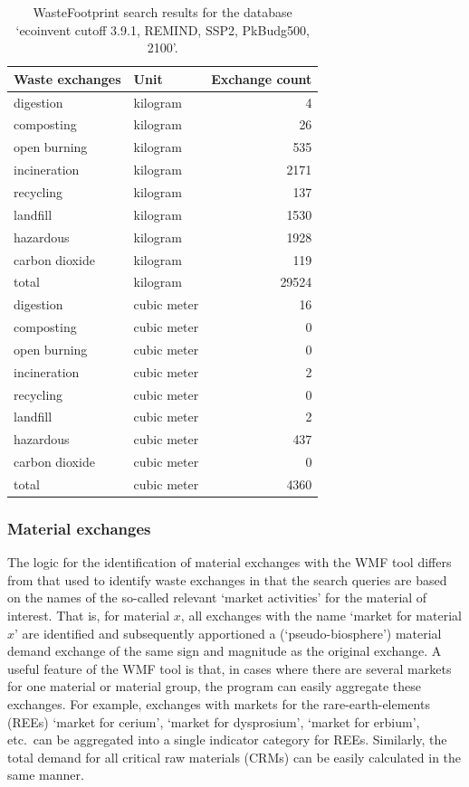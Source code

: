 \begin{table}[ht]
    \centering
    \caption{WasteFootprint search results for the database `ecoinvent cutoff 3.9.1, REMIND, SSP2, PkBudg500, 2100'.}\label{tab:wf_results}
    \begin{tabular}{llr}
        \toprule
        \textbf{Waste exchanges} & \textbf{Unit} & \textbf{Exchange count} \\
        \midrule
        digestion & kilogram & 4 \\
        composting & kilogram & 26 \\
        open burning & kilogram & 535 \\
        incineration & kilogram & 2171 \\
        recycling & kilogram & 137 \\
        landfill & kilogram & 1530 \\
        hazardous & kilogram & 1928 \\
        carbon dioxide & kilogram & 119 \\
        total & kilogram & 29524 \\
        digestion & cubic meter & 16 \\
        composting & cubic meter & 0 \\
        open burning & cubic meter & 0 \\
        incineration & cubic meter & 2 \\
        recycling & cubic meter & 0 \\
        landfill & cubic meter & 2 \\
        hazardous & cubic meter & 437 \\
        carbon dioxide & cubic meter & 0 \\
        total & cubic meter & 4360 \\
        \bottomrule
\end{tabular}
\end{table}

\subsubsection{Material exchanges}\label{sec:results-wmf-material_exchanges}

The logic for the identification of material exchanges with the WMF tool differs from that used to identify waste exchanges in that the search queries are based on the names of the so-called relevant `market activities' for the material of interest. That is, for material $x$, all exchanges with the name `market for material $x$' are identified and subsequently apportioned a (`pseudo-biosphere') material demand exchange of the same sign and magnitude as the original exchange. A useful feature of the WMF tool is that, in cases where there are several markets for one material or material group, the program can easily aggregate these exchanges. For example, exchanges with markets for the rare-earth-elements (REEs) `market for cerium', `market for dysprosium', `market for erbium', etc.\ can be aggregated into a single indicator category for REEs. Similarly, the total demand for all critical raw materials (CRMs) can be easily calculated in the same manner. 

